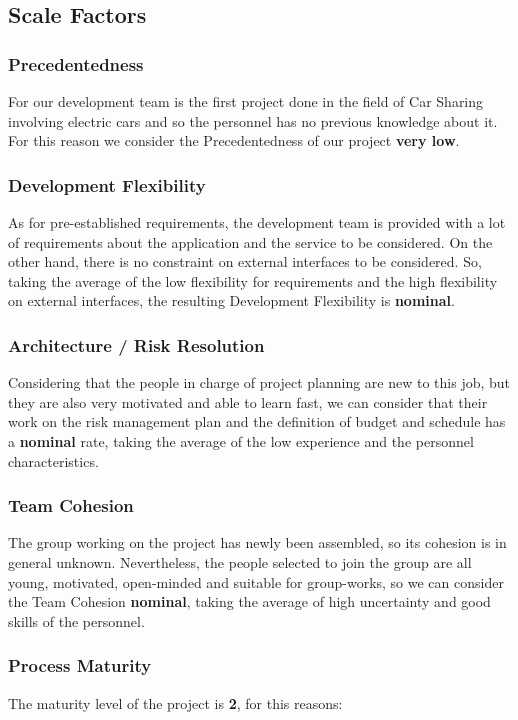 \subsection{Scale Factors}
\subsubsection{Precedentedness}
For our development team is the first project done in the field of Car Sharing involving electric cars and so the personnel has no previous knowledge about it. For this reason we consider the Precedentedness of our project \textbf{very low}.

\subsubsection{Development Flexibility}
As for pre-established requirements, the development team is provided with a lot of requirements about the application and the service to be considered. On the other hand, there is no constraint on external interfaces to be considered.
So, taking the average of the low flexibility for requirements and the high flexibility on external interfaces, the resulting Development Flexibility is \textbf{nominal}.

\subsubsection{Architecture / Risk Resolution}
Considering that the people in charge of project planning are new to this job, but they are also very motivated and able to learn fast, we can consider that their work on the risk management plan and the definition of budget and schedule has a \textbf{nominal} rate, taking the average of the low experience and the personnel characteristics.

\subsubsection{Team Cohesion}
The group working on the project has newly been assembled, so its cohesion is in general unknown. Nevertheless, the people selected to join the group are all young, motivated, open-minded and suitable for group-works, so we can consider the Team Cohesion \textbf{nominal}, taking the average of high uncertainty and good skills of the personnel.

\subsubsection{Process Maturity}
The maturity level of the project is \textbf{2}, for this reasons:

